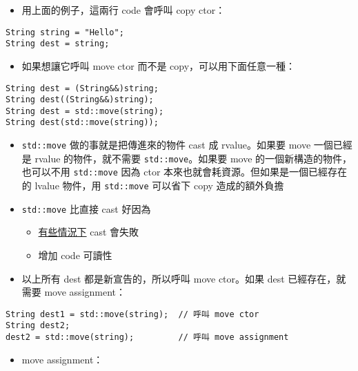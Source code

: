 \documentclass[11pt]{article}
\providecommand{\tightlist}{%
      \setlength{\itemsep}{0pt}\setlength{\parskip}{0pt}}
\begin{document}
\begin{itemize}
\tightlist
\item
  用上面的例子，這兩行 code 會呼叫 copy ctor：
\end{itemize}

\begin{verbatim}
String string = "Hello";
String dest = string;
\end{verbatim}

\begin{itemize}
\tightlist
\item
  如果想讓它呼叫 move ctor 而不是 copy，可以用下面任意一種：
\end{itemize}

\begin{verbatim}
String dest = (String&&)string;
String dest((String&&)string);
String dest = std::move(string);
String dest(std::move(string));
\end{verbatim}

\begin{itemize}
\tightlist
\item
  \texttt{std::move} 做的事就是把傳進來的物件 cast 成 rvalue。如果要
  move 一個已經是 rvalue 的物件，就不需要 \texttt{std::move}。如果要
  move 的一個新構造的物件，也可以不用 \texttt{std::move} 因為 ctor
  本來也就會耗資源。但如果是一個已經存在的 lvalue 物件，用
  \texttt{std::move} 可以省下 copy 造成的額外負擔
\item
  \texttt{std::move} 比直接 cast 好因為

  \begin{itemize}
  \tightlist
  \item
    \href{https://youtu.be/OWNeCTd7yQE?list=PLlrATfBNZ98dudnM48yfGUldqGD0S4FFb\&t=306}{有些情況下}
    cast 會失敗
  \item
    增加 code 可讀性
  \end{itemize}
\item
  以上所有 dest 都是新宣告的，所以呼叫 move ctor。如果 dest
  已經存在，就需要 move assignment：
\end{itemize}

\begin{verbatim}
String dest1 = std::move(string);  // 呼叫 move ctor
String dest2;
dest2 = std::move(string);         // 呼叫 move assignment
\end{verbatim}

\begin{itemize}
\tightlist
\item
  move assignment：
\end{itemize}
\end{document}
